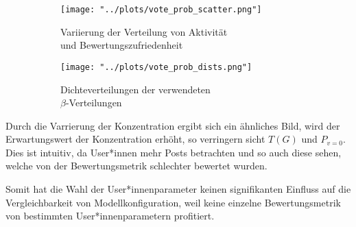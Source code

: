 \begin{figure}[!h]
	\begin{subfigure}{0.5\textwidth}
		\texttt{[image: "../plots/vote\_prob\_scatter.png"]}
		\caption{Variierung der Verteilung von Aktivität\\ und Bewertungszufriedenheit}
		\label{fig:user_params_a}
	\end{subfigure}
	\begin{subfigure}{0.5\textwidth}
		\texttt{[image: "../plots/vote\_prob\_dists.png"]}
		\caption{Dichteverteilungen der verwendeten \\ $\beta$-Verteilungen}
		\label{fig:user_params_b}
	\end{subfigure}
	\caption{}
	\label{fig:user_params}	
\end{figure}

Durch die Varrierung der Konzentration ergibt sich ein ähnliches Bild, wird der Erwartungswert der Konzentration erhöht, so verringern sicht $T(G)$ und $P_{v=0}$. Dies ist intuitiv, da User*innen mehr Posts betrachten und so auch diese sehen, welche von der Bewertungsmetrik schlechter bewertet wurden.

Somit hat die Wahl der User*innenparameter keinen signifikanten Einfluss auf die Vergleichbarkeit von Modellkonfiguration, weil keine einzelne Bewertungsmetrik von bestimmten User*innenparametern profitiert.







